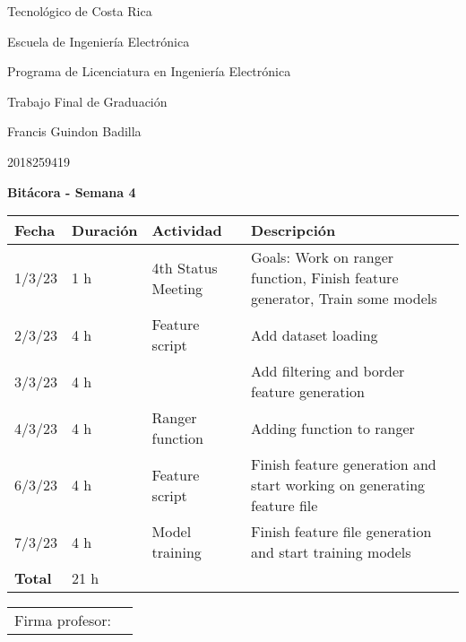 \documentclass[12pt,oneside]{book}
\begin{document}
 \graphicspath{{./}{../tesis/fig/}}
  Tecnológico de Costa Rica
  \par\vspace{1mm}
  Escuela de Ingeniería Electrónica
  \par\vspace{1mm}
  Programa de Licenciatura en Ingeniería Electrónica
  \par\vspace{10mm}
  Trabajo Final de Graduación
  \par\vspace{1mm}
  Francis Guindon Badilla
  \par\vspace{1mm}
  2018259419
  \par\vspace{10mm}
  \large\textbf{Bitácora - Semana 4}
  \par\vspace{10mm}
  \small

  \begin{table} [!h]
    \centering
    \small
    \begin{tabular}{p{1.5 cm} p{2.1 cm} p{5 cm} p{8 cm}}
      \hline
      Fecha & Duración & Actividad & Descripción \\
      \hline
      1/3/23 & 1 h & 4th Status Meeting & Goals: Work on ranger function, Finish feature generator, Train some models \\
      2/3/23 & 4 h & Feature script & Add dataset loading \\
      3/3/23 & 4 h & & Add filtering and border feature generation \\
      4/3/23 & 4 h & Ranger function & Adding function to ranger \\
      6/3/23 & 4 h & Feature script & Finish feature generation and start working on generating feature file \\
      7/3/23 & 4 h & Model training & Finish feature file generation and start training models \\
      \hline
      \textbf{Total} & 21 h \\
      \hline
    \end{tabular}
  \end{table}
  
  \vfill

  \begin{tabular}{p{3 cm} p{10 cm}}
    Firma profesor: & \\
    \cline{2-2}
  \end{tabular}
\end{document}

